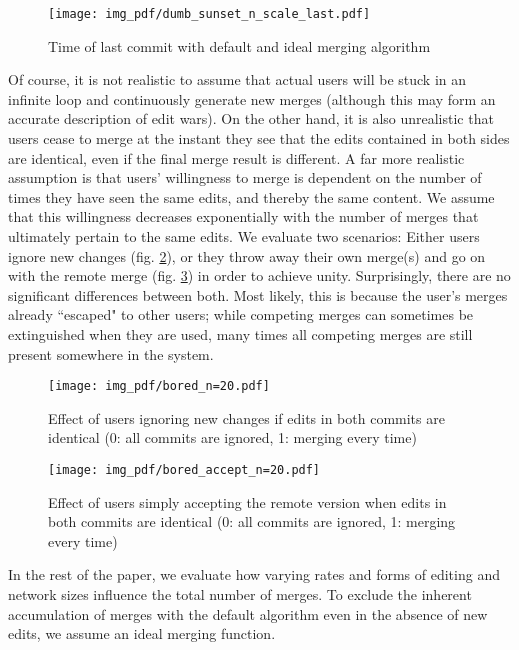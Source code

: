 \documentclass[conference,letterpaper]{IEEEtran}
\begin{document}
\begin{figure}
  \texttt{[image: img\_pdf/dumb\_sunset\_n\_scale\_last.pdf]}
  \caption{Time of last commit with default and ideal merging algorithm}
  \label{fig:dumb_sunset}
\end{figure}

Of course, it is not realistic to assume that actual users will be stuck in an infinite loop and continuously generate new merges (although this may form an accurate description of edit wars). On the other hand, it is also unrealistic that users cease to merge at the instant they see that the edits contained in both sides are identical, even if the final merge result is different. A far more realistic assumption is that users' willingness to merge is dependent on the number of times they have seen the same edits, and thereby the same content. We assume that this willingness decreases exponentially with the number of merges that ultimately pertain to the same edits. We evaluate two scenarios:
Either users ignore new changes (fig. \ref{fig:bored}), or they throw away their own merge(s) and go on with the remote merge (fig. \ref{fig:bored_accept}) in order to achieve unity. Surprisingly, there are no significant differences between both. Most likely, this is because the user's merges already ``escaped" to other users; while competing merges can sometimes be extinguished when they are used, many times all competing merges are still present somewhere in the system.

\begin{figure}
  \texttt{[image: img\_pdf/bored\_n=20.pdf]}
  \caption{Effect of users ignoring new changes if edits in both commits are identical (0: all commits are ignored, 1: merging every time)}
  \label{fig:bored}
\end{figure}

\begin{figure}
  \texttt{[image: img\_pdf/bored\_accept\_n=20.pdf]}
  \caption{Effect of users simply accepting the remote version when edits in both commits are identical (0: all commits are ignored, 1: merging every time)}
  \label{fig:bored_accept}
\end{figure}

In the rest of the paper, we evaluate how varying rates and forms of editing and network sizes influence the total number of merges. To exclude the inherent accumulation of merges with the default algorithm even in the absence of new edits, we assume an ideal merging function.
\end{document}
